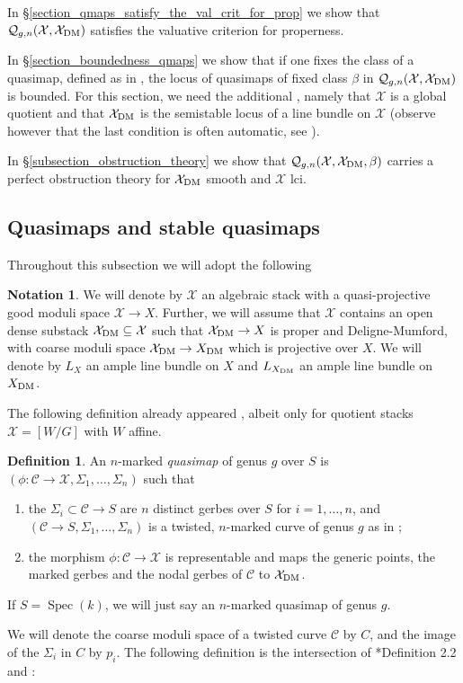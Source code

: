 \documentclass{amsart}
\newcommand{\sC}{\mathscr{C}}
\newcommand{\cQ}{\mathcal{Q}}
\newcommand{\cX}{\mathcal{X}}
\newcommand{\spec}{\operatorname{Spec}}
\newcommand{\dm}{{\rm DM}}
\theoremstyle{definition}
\newtheorem{Def}[theorem]{Definition}
\newtheorem{Notation}[theorem]{Notation}
\theoremstyle{definition}
\begin{document}
{In \S \ref{section_qmaps_satisfy_the_val_crit_for_prop} we show that $\cQ_{g,n}(\cX,\cX_\dm)$ satisfies the valuative criterion for properness. 

In \S \ref{section_boundedness_qmaps} we show that if one fixes the class of a quasimap, defined as in \cite{ciocan2014stable}, the locus of quasimaps of fixed class $\beta$ in $\cQ_{g,n}(\cX,\cX_\dm)$ is bounded.
For this section, we need the additional , namely that $\cX$ is a global quotient and that $\cX_\dm$ is the semistable locus of a line bundle on $\cX$ (observe however that the last condition is often automatic, see ).

In \S \ref{subsection_obstruction_theory} we show that $\cQ_{g,n}(\cX,\cX_\dm,\beta)$ carries a perfect obstruction theory for $\cX_\dm$ smooth and $\cX$ lci.

\subsection{Quasimaps and stable quasimaps}\label{subsection_def_stable_qmaps}
Throughout this subsection we will adopt the following 
\begin{Notation}\label{notation_cX_and_cX_dm}
    We will denote by $\cX$ an algebraic stack with a quasi-projective good moduli space $\cX\to X$. Further, we will assume that $\cX$ contains an open dense substack $\cX_\dm\subseteq \cX$ such that $\cX_\dm\to X$ is proper and Deligne-Mumford, with coarse moduli space $\cX_\dm\to X_\dm$ which is projective over $X$. We will denote by $L_X$ an ample line bundle on $X$ and $L_{X_\dm}$ an ample line bundle on $X_\dm$.  
\end{Notation}
The following definition already appeared \cite{orbifold_qmap_theory}, albeit only for quotient stacks $\cX=[W/G]$ with $W$ affine.
\begin{Def}\label{def:quasimap}
    An $n$-marked \emph{quasimap} of genus $g$ over $S$ is $(\phi:\sC\to \cX, \Sigma_1,\ldots, \Sigma_n) $ such that
    \begin{enumerate}
        \item the $\Sigma_i \subset \sC \to S$ are $n$ distinct gerbes over $S$ for $i=1,\ldots,n$, and $(\sC \to S,\Sigma_1,\ldots,\Sigma_n)$ is a twisted, $n$-marked curve of genus $g$ as in \cite{AV_compactifying};
        \item the morphism $\phi:\sC\to \cX$ is representable and maps the generic points, the marked gerbes and the nodal gerbes of $\sC$ to $\cX_\dm$.
    \end{enumerate}
    If $S=\spec(k)$, we will just say an $n$-marked quasimap of genus $g$.
\end{Def}   
We will denote the coarse moduli space of a twisted curve $\sC$ by $C$, and the image of the $\Sigma_i$ in $C$ by $p_i$.
The following definition is the intersection of \cite{dli1}*{Definition 2.2} and :

}
\end{document}
